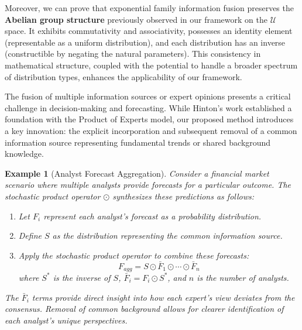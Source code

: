 \documentclass[letterpaper]{article} %
\newtheorem{example}[theorem]{Example}
\theoremstyle{definition}
\theoremstyle{remark}
\begin{document}


Moreover, we can prove that exponential family information fusion preserves the \textbf{Abelian group structure} previously observed in our framework on the $\mathcal{U}$ space. It exhibits commutativity and associativity, possesses an identity element (representable as a uniform distribution), and each distribution has an inverse (constructible by negating the natural parameters). This consistency in mathematical structure, coupled with the potential to handle a broader spectrum of distribution types, enhances the applicability of our framework.


The fusion of multiple information sources or expert opinions presents a critical challenge in decision-making and forecasting. While Hinton's work \cite{hinton2002training} established a foundation with the Product of Experts model, our proposed method introduces a key innovation: the explicit incorporation and subsequent removal of a common information source representing fundamental trends or shared background knowledge.

\begin{example}[Analyst Forecast Aggregation]
Consider a financial market scenario where multiple analysts provide forecasts for a particular outcome. The stochastic product operator $\odot$ synthesizes these predictions as follows:

\begin{enumerate}
    \item Let $F_i$ represent each analyst's forecast as a probability distribution.
    \item Define $S$ as the distribution representing the common information source.
    \item Apply the stochastic product operator to combine these forecasts:
    \begin{equation}
        F_{agg} = S \odot \bar{F}_1  \odot \cdots \odot \bar{F}_n
    \end{equation}
    where $S^*$ is the inverse of $S$, $\bar{F}_i = F_i \odot S^*$, and $n$ is the number of analysts.
\end{enumerate}

The $\bar{F}_i$ terms provide direct insight into how each expert's view deviates from the consensus. Removal of common background allows for clearer identification of each analyst's unique perspectives.
\end{example}
\end{document}
